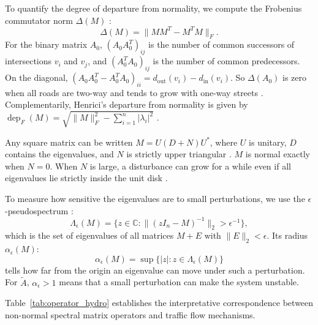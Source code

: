 \documentclass[journal]{IEEEtran}
\begin{document}
To quantify the degree of departure from normality, we compute the Frobenius commutator norm $\Delta(M)$ \cite{Henrici1962, Asllani2018}:
\begin{equation}
\Delta(M) = \| M M^T - M^T M \|_F.
\label{eq:commutator}
\end{equation}
For the binary matrix $A_0$, $(A_0 A_0^T)_{ij}$ is the number of common successors of intersections $v_i$ and $v_j$, and $(A_0^T A_0)_{ij}$ is the number of common predecessors. On the diagonal, $(A_0 A_0^T - A_0^T A_0)_{ii} = d_{\text{out}}(v_i) - d_{\text{in}}(v_i)$. So $\Delta(A_0)$ is zero when all roads are two-way and tends to grow with one-way streets \cite{Asllani2018}. Complementarily, Henrici's departure from normality is given by $\operatorname{dep}_F(M) = \sqrt{\|M\|_F^2 - \sum_{i=1}^n |\lambda_i|^2}$ \cite{Henrici1962, Elsner1987}.

Any square matrix can be written $M = U (D + N) U^*$, where $U$ is unitary, $D$ contains the eigenvalues, and $N$ is strictly upper triangular \cite{Horn2013}. $M$ is normal exactly when $N = 0$. When $N$ is large, a disturbance can grow for a while even if all eigenvalues lie strictly inside the unit disk \cite{Trefethen2005}.

To measure how sensitive the eigenvalues are to small perturbations, we use the $\epsilon$-pseudospectrum \cite{Trefethen2005}:
\begin{equation}
\Lambda_\epsilon(M) = \{ z \in \mathbb{C} : \|(z I_n - M)^{-1}\|_2 > \epsilon^{-1} \},
\label{eq:pseudospectrum}
\end{equation}
which is the set of eigenvalues of all matrices $M + E$ with $\|E\|_2 < \epsilon$. Its radius $\alpha_\epsilon(M)$:
\begin{equation}
\alpha_\epsilon(M) = \sup \{ |z| : z \in \Lambda_\epsilon(M) \}
\label{eq:pseudospectral_radius}
\end{equation}
tells how far from the origin an eigenvalue can move under such a perturbation. For $\tilde{A}$, $\alpha_\epsilon > 1$ means that a small perturbation can make the system unstable.

Table~\ref{tab:operator_hydro} establishes the interpretative correspondence between non-normal spectral matrix operators and traffic flow mechanisms.
\end{document}
